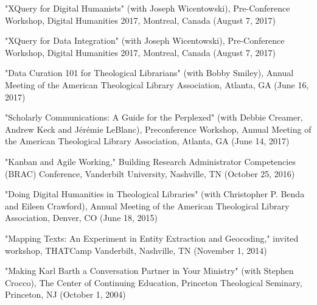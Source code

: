 \documentclass[10pt]{res} %
\begin{document}
\begin{resume}
\begin{hangparas}{.25in}{1}"XQuery for Digital Humanists" (with Joseph Wicentowski), Pre-Conference Workshop, Digital Humanities 2017, Montreal, Canada (August 7, 2017)\end{hangparas}

\begin{hangparas}{.25in}{1}"XQuery for Data Integration" (with Joseph Wicentowski), Pre-Conference Workshop, Digital Humanities 2017, Montreal, Canada (August 7, 2017)\end{hangparas}

\begin{hangparas}{.25in}{1}"Data Curation 101 for Theological Librarians" (with Bobby Smiley), Annual Meeting of the American Theological Library Association, Atlanta, GA (June 16, 2017)\end{hangparas}

\begin{hangparas}{.25in}{1}"Scholarly Communications: A Guide for the Perplexed" (with Debbie Creamer, Andrew Keck and Jérémie LeBlanc), Preconference Workshop, Annual Meeting of the American Theological Library Association, Atlanta, GA (June 14, 2017)\end{hangparas}

\begin{hangparas}{.25in}{1}"Kanban and Agile Working," Building Research Administrator Competencies (BRAC) Conference, Vanderbilt University, Nashville, TN (October 25, 2016)\end{hangparas}

\begin{hangparas}{.25in}{1}"Doing Digital Humanities in Theological Libraries" (with Christopher P. Benda and Eileen Crawford), Annual Meeting of the American Theological Library Association, Denver, CO (June 18, 2015)\end{hangparas}

\begin{hangparas}{.25in}{1}"Mapping Texts: An Experiment in Entity Extraction and Geocoding," invited workshop, THATCamp Vanderbilt, Nashville, TN (November 1, 2014)\end{hangparas}

\begin{hangparas}{.25in}{1}"Making Karl Barth a Conversation Partner in Your Ministry" (with Stephen Crocco), The Center of Continuing Education, Princeton Theological Seminary, Princeton, NJ (October 1, 2004)\end{hangparas}


\end{resume}
\end{document}
